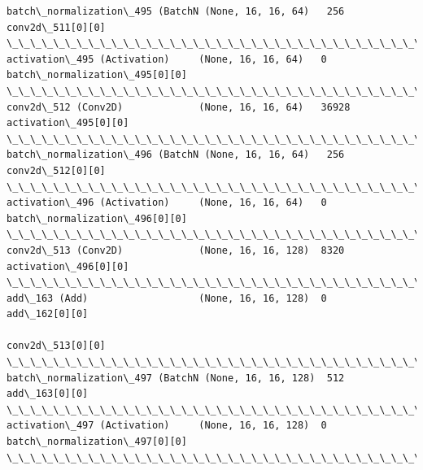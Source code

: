 \documentclass[11pt]{article}
\begin{document}
\begin{Verbatim}[commandchars=\\\{\}]
batch\_normalization\_495 (BatchN (None, 16, 16, 64)   256         conv2d\_511[0][0]                 
\_\_\_\_\_\_\_\_\_\_\_\_\_\_\_\_\_\_\_\_\_\_\_\_\_\_\_\_\_\_\_\_\_\_\_\_\_\_\_\_\_\_\_\_\_\_\_\_\_\_\_\_\_\_\_\_\_\_\_\_\_\_\_\_\_\_\_\_\_\_\_\_\_\_\_\_\_\_\_\_\_\_\_\_\_\_\_\_\_\_\_\_\_\_\_\_\_\_
activation\_495 (Activation)     (None, 16, 16, 64)   0           batch\_normalization\_495[0][0]    
\_\_\_\_\_\_\_\_\_\_\_\_\_\_\_\_\_\_\_\_\_\_\_\_\_\_\_\_\_\_\_\_\_\_\_\_\_\_\_\_\_\_\_\_\_\_\_\_\_\_\_\_\_\_\_\_\_\_\_\_\_\_\_\_\_\_\_\_\_\_\_\_\_\_\_\_\_\_\_\_\_\_\_\_\_\_\_\_\_\_\_\_\_\_\_\_\_\_
conv2d\_512 (Conv2D)             (None, 16, 16, 64)   36928       activation\_495[0][0]             
\_\_\_\_\_\_\_\_\_\_\_\_\_\_\_\_\_\_\_\_\_\_\_\_\_\_\_\_\_\_\_\_\_\_\_\_\_\_\_\_\_\_\_\_\_\_\_\_\_\_\_\_\_\_\_\_\_\_\_\_\_\_\_\_\_\_\_\_\_\_\_\_\_\_\_\_\_\_\_\_\_\_\_\_\_\_\_\_\_\_\_\_\_\_\_\_\_\_
batch\_normalization\_496 (BatchN (None, 16, 16, 64)   256         conv2d\_512[0][0]                 
\_\_\_\_\_\_\_\_\_\_\_\_\_\_\_\_\_\_\_\_\_\_\_\_\_\_\_\_\_\_\_\_\_\_\_\_\_\_\_\_\_\_\_\_\_\_\_\_\_\_\_\_\_\_\_\_\_\_\_\_\_\_\_\_\_\_\_\_\_\_\_\_\_\_\_\_\_\_\_\_\_\_\_\_\_\_\_\_\_\_\_\_\_\_\_\_\_\_
activation\_496 (Activation)     (None, 16, 16, 64)   0           batch\_normalization\_496[0][0]    
\_\_\_\_\_\_\_\_\_\_\_\_\_\_\_\_\_\_\_\_\_\_\_\_\_\_\_\_\_\_\_\_\_\_\_\_\_\_\_\_\_\_\_\_\_\_\_\_\_\_\_\_\_\_\_\_\_\_\_\_\_\_\_\_\_\_\_\_\_\_\_\_\_\_\_\_\_\_\_\_\_\_\_\_\_\_\_\_\_\_\_\_\_\_\_\_\_\_
conv2d\_513 (Conv2D)             (None, 16, 16, 128)  8320        activation\_496[0][0]             
\_\_\_\_\_\_\_\_\_\_\_\_\_\_\_\_\_\_\_\_\_\_\_\_\_\_\_\_\_\_\_\_\_\_\_\_\_\_\_\_\_\_\_\_\_\_\_\_\_\_\_\_\_\_\_\_\_\_\_\_\_\_\_\_\_\_\_\_\_\_\_\_\_\_\_\_\_\_\_\_\_\_\_\_\_\_\_\_\_\_\_\_\_\_\_\_\_\_
add\_163 (Add)                   (None, 16, 16, 128)  0           add\_162[0][0]                    
                                                                 conv2d\_513[0][0]                 
\_\_\_\_\_\_\_\_\_\_\_\_\_\_\_\_\_\_\_\_\_\_\_\_\_\_\_\_\_\_\_\_\_\_\_\_\_\_\_\_\_\_\_\_\_\_\_\_\_\_\_\_\_\_\_\_\_\_\_\_\_\_\_\_\_\_\_\_\_\_\_\_\_\_\_\_\_\_\_\_\_\_\_\_\_\_\_\_\_\_\_\_\_\_\_\_\_\_
batch\_normalization\_497 (BatchN (None, 16, 16, 128)  512         add\_163[0][0]                    
\_\_\_\_\_\_\_\_\_\_\_\_\_\_\_\_\_\_\_\_\_\_\_\_\_\_\_\_\_\_\_\_\_\_\_\_\_\_\_\_\_\_\_\_\_\_\_\_\_\_\_\_\_\_\_\_\_\_\_\_\_\_\_\_\_\_\_\_\_\_\_\_\_\_\_\_\_\_\_\_\_\_\_\_\_\_\_\_\_\_\_\_\_\_\_\_\_\_
activation\_497 (Activation)     (None, 16, 16, 128)  0           batch\_normalization\_497[0][0]    
\_\_\_\_\_\_\_\_\_\_\_\_\_\_\_\_\_\_\_\_\_\_\_\_\_\_\_\_\_\_\_\_\_\_\_\_\_\_\_\_\_\_\_\_\_\_\_\_\_\_\_\_\_\_\_\_\_\_\_\_\_\_\_\_\_\_\_\_\_\_\_\_\_\_\_\_\_\_\_\_\_\_\_\_\_\_\_\_\_\_\_\_\_\_\_\_\_\_

\end{Verbatim}
\end{document}
